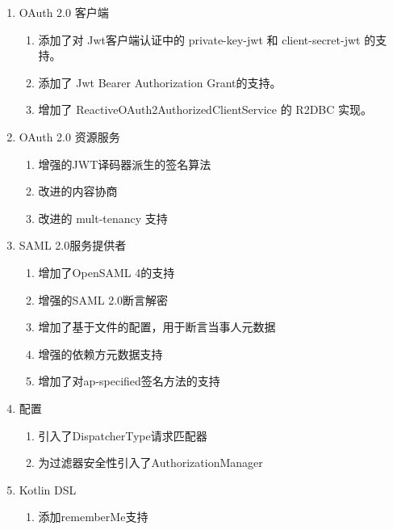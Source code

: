 \begin{enumerate}
  \item OAuth 2.0 客户端
        \begin{enumerate}
          \item 添加了对 Jwt客户端认证中的 private-key-jwt 和 client-secret-jwt 的支持。
          \item 添加了 Jwt Bearer Authorization Grant的支持。
          \item 增加了 ReactiveOAuth2AuthorizedClientService 的 R2DBC 实现。
        \end{enumerate}
  \item OAuth 2.0 资源服务
        \begin{enumerate}
          \item 增强的JWT译码器派生的签名算法
          \item 改进的内容协商
          \item 改进的 mult-tenancy 支持
        \end{enumerate}
  \item SAML 2.0服务提供者
        \begin{enumerate}
          \item 增加了OpenSAML 4的支持
          \item 增强的SAML 2.0断言解密
          \item 增加了基于文件的配置，用于断言当事人元数据
          \item 增强的依赖方元数据支持
          \item 增加了对ap-specified签名方法的支持
        \end{enumerate}
  \item 配置
        \begin{enumerate}
          \item 引入了DispatcherType请求匹配器
          \item 为过滤器安全性引入了AuthorizationManager
        \end{enumerate}
  \item Kotlin DSL
        \begin{enumerate}
          \item 添加rememberMe支持
        \end{enumerate}
\end{enumerate}

